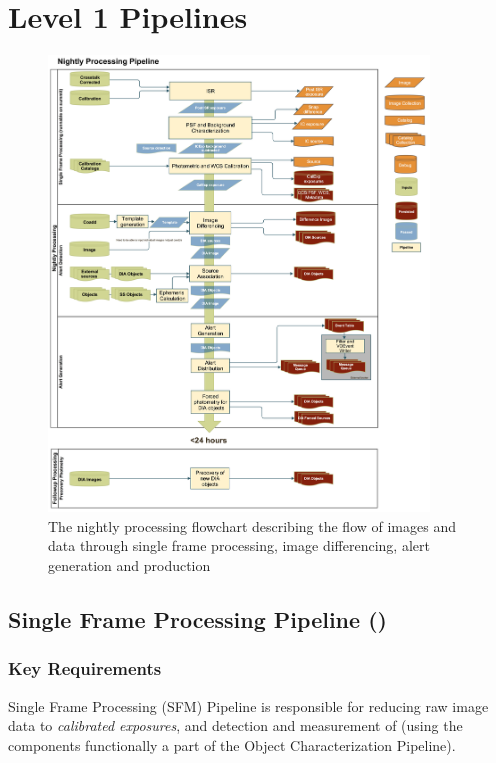 \section{Level 1 Pipelines}
\label{sec:ap}

\begin{figure}[th]
\begin{center}
\includegraphics[width=0.9\textwidth]{figures/Level_1_Processing_Flowchart.jpg}
\caption{\label{fig:nightly} The nightly processing flowchart
  describing the flow of images and data through single frame
  processing, image differencing, alert generation and production}
\end{center}
\end{figure}

\subsection{Single Frame Processing Pipeline (\wbsSFM)}

\subsubsection{Key Requirements}

Single Frame Processing (SFM) Pipeline is responsible for reducing raw image data to \emph{calibrated exposures}, and detection and measurement of \Sources (using the components functionally a part of the Object Characterization Pipeline).
\\

